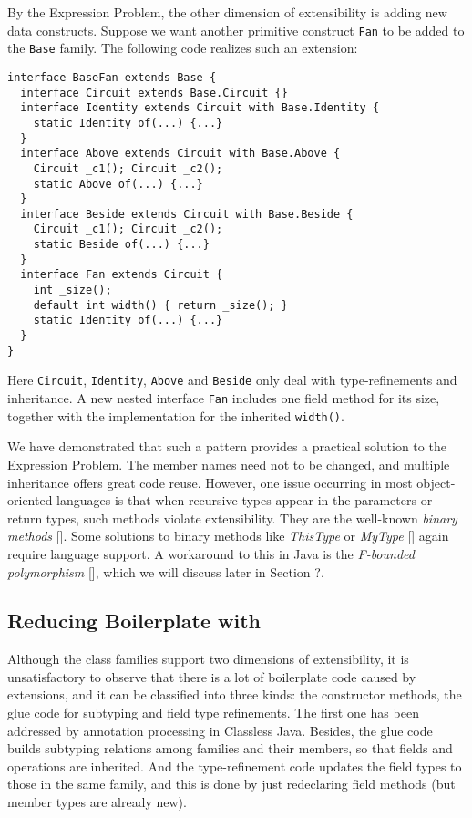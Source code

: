 By the Expression Problem, the other dimension of extensibility is adding new data constructs. Suppose we want another primitive
construct \lstinline|Fan| to be added
to the \lstinline|Base| family. The following code realizes such an extension:

\begin{lstlisting}
interface BaseFan extends Base {
  interface Circuit extends Base.Circuit {}
  interface Identity extends Circuit with Base.Identity {
    static Identity of(...) {...}
  }
  interface Above extends Circuit with Base.Above {
    Circuit _c1(); Circuit _c2();
    static Above of(...) {...}
  }
  interface Beside extends Circuit with Base.Beside {
    Circuit _c1(); Circuit _c2();
    static Beside of(...) {...}
  }
  interface Fan extends Circuit {
    int _size();
    default int width() { return _size(); }
    static Identity of(...) {...}
  }
}
\end{lstlisting}
Here \lstinline|Circuit|, \lstinline|Identity|, \lstinline|Above| and \lstinline|Beside| only deal with type-refinements and inheritance. A
new nested interface \lstinline|Fan| includes one field method for its size, together with
the implementation for the inherited \lstinline|width()|.

We have demonstrated that such a pattern provides a practical solution to the Expression Problem. The member
names need not to be changed, and multiple inheritance offers great code reuse. However, one issue occurring
in most object-oriented languages is that when recursive types appear in the parameters or return types,
such methods violate extensibility. They are the well-known \textit{binary methods} []. Some solutions to binary methods
like \textit{ThisType} or \textit{MyType} [] again require language support. A workaround to this in Java
is the \textit{F-bounded polymorphism} [], which we will discuss later in Section ?.

\subsection{Reducing Boilerplate with \name}
Although the class families support two dimensions of extensibility, it is unsatisfactory to observe that there is a lot
of boilerplate code caused by extensions, and it can be classified into three kinds: the constructor methods, the glue code for subtyping
and field type refinements. The first one has been addressed by annotation processing in Classless Java. Besides,
the glue code builds subtyping relations among families and their members, so that fields and operations are inherited.
And the type-refinement code updates the field types to those in the same family, and this is done by just redeclaring field
methods (but member types are already new).

